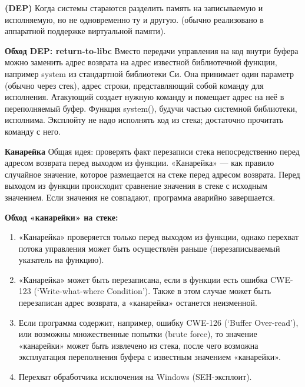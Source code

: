 \textbf{(DEP)} Когда системы стараются разделить память на записываемую и исполняемую, но не одновременно ту и другую. (обычно реализовано в аппаратной поддержке виртуальной памяти). 

\textbf{Обход DEP: return-to-libc}
Вместо передачи управления на код внутри буфера можно заменить адрес возврата на адрес известной библиотечной функции, например system из стандартной библиотеки Си. Она принимает один параметр (обычно через стек), адрес строки, представляющий собой команду для исполнения. Атакующий создает нужную команду и помещает адрес на неё в переполняемый буфер. Функция system(), будучи частью системной библиотеки, исполнима. Эксплойту не надо исполнять код из стека; достаточно прочитать команду с него.

\textbf{Канарейка }
Общая идея: проверять факт перезаписи стека непосредственно перед адресом возврата перед выходом из функции. «Канарейка» — как правило случайное значение, которое размещается на стеке перед адресом возврата. Перед выходом из функции происходит сравнение значения в стеке с исходным значением. Если значения не совпадают, программа аварийно завершается.

\textbf{Обход «канарейки» на стеке:}
\begin{enumerate}
    \item «Канарейка» проверяется только перед выходом из функции, однако перехват потока управления может быть осуществлён раньше (перезаписываемый указатель на функцию).
    \item «Канарейка» может быть перезаписана, если в функции есть ошибка CWE-123 (‘Write-what-where Condition’). Также в этом случае может быть перезаписан адрес возврата, а «канарейка» останется неизменной.
    \item Если программа содержит, например, ошибку CWE-126 (‘Buffer Over-read’), или возможны множественные попытки (brute force), то значение «канарейки» может быть извлечено из стека, после чего возможна эксплуатация переполнения буфера с известным значением «канарейки».
    \item Перехват обработчика исключения на Windows (SEH-эксплоит).
\end{enumerate}


